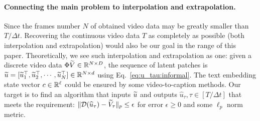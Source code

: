 \paragraph{Connecting the main problem to interpolation and extrapolation.} Since the frames number $N$ of obtained video data may be greatly smaller than $T/\Delta t$. Recovering the continuous video data $T$ as completely as possible (both interpolation and extrapolation) would also be our goal in the range of this paper. Theoretically, we see such interpolation and extrapolation as one: given a discrete video data $\Phi \widetilde{V} \in \mathbb{R}^{N \times D}$, the sequence of latent patches is $\widetilde{u} = [\widetilde{u}_1^\top, \widetilde{u}_2^\top, \cdots, \widetilde{u}_N^\top] \in \mathbb{R}^{N \times d}$ using Eq.~\eqref{eq:u_tau:informal}. The text embedding state vector $c \in \mathbb{R}^{\ell}$ could be ensured by some video-to-caption methods. Our target is to find an algorithm that inputs $\widetilde{u}$ and outputs $\hat{u}_{\tau}, \tau \in [T/\Delta t]$ that meets the requirement: $\| {\cal D}(\widehat{u}_\tau) - \widetilde{V}_\tau \|_p \leq \epsilon$ for error $\epsilon \ge 0$ and some $\ell_p$ norm metric.
